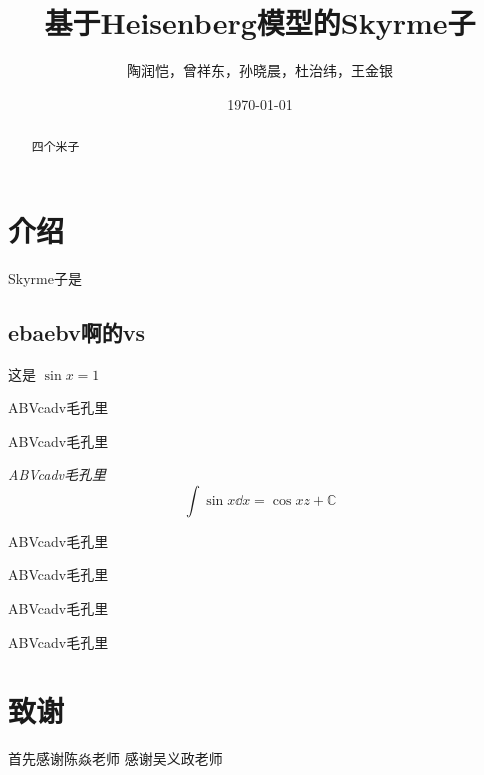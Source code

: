 \documentclass{ctexart}
\title{
	\vspace{-2 cm} \LARGE \bfseries
	基于Heisenberg模型的Skyrme子
}
\author{
	\CJKfamily{楷体}
	陶润恺，曾祥东，孙晓晨，杜治纬，王金银
}
\date{
	\CJKfamily{楷体}
	\today
}
\newcommand{\myHeavy}{\helvetica \CJKfamily{黑体}}
\newcommand{\emphA}[1]{{\myHeavy #1}}
\newcommand{\emphB}[1]{{\itshape #1}}
\newenvironment{myAbstract}
	{\begin{abstract} \normalsize}
	{\end{abstract}}
\begin{document}
	\maketitle
	
	\begin{myAbstract}
		四个米子
	\end{myAbstract}
	
	\section{介绍}
		Skyrme子是
		
		\subsection{ebaebv啊的vs}
		这是 $\sin x = 1$
		
		\textsf{ABVcadv毛孔里}
		
		\emphA{ABVcadv毛孔里}
		
		\emphB{ABVcadv毛孔里}
		\begin{equation}
			\int \sin x \dd x = \cos xz +\mathbb{C}
		\end{equation}
		
		\textcolor{red!50!black}{ABVcadv毛孔里}
		
		
		\textcolor{blue!50!black}{ABVcadv毛孔里}
		
		
		\textcolor{blue!70!black}{ABVcadv毛孔里}
		
		
		\textcolor{green!50!black}{ABVcadv毛孔里}
	\section{致谢}
		首先感谢陈焱老师
		感谢吴义政老师
\end{document}
